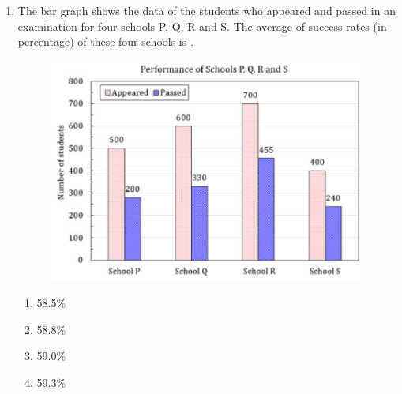 \documentclass[12pt,onecolumn]{article}
\begin{document}
\begin{enumerate}
    \item The bar graph shows the data of the students who appeared and passed in an examination for four schools P, Q, R and S. The average of success rates (in percentage) of these four schools is \underline{\hspace{2cm}}.
          \begin{figure}[H]
              \centering
              \includegraphics[scale=0.4]{q10}
              \label{fig:q10}
          \end{figure}
          \begin{enumerate}
              \item 58.5\%
              \item 58.8\%
              \item 59.0\%
              \item 59.3\%
          \end{enumerate}

\end{enumerate}
\end{document}
